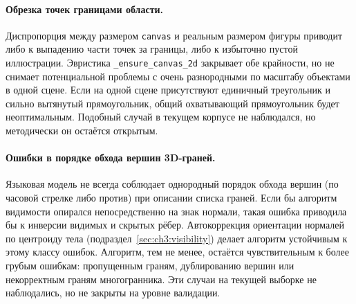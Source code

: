 \paragraph{Обрезка точек границами области.} Диспропорция между размером \texttt{canvas} и реальным размером фигуры приводит либо к выпадению части точек за границы, либо к избыточно пустой иллюстрации. Эвристика \texttt{\_ensure\_canvas\_2d} закрывает обе крайности, но не снимает потенциальной проблемы с очень разнородными по масштабу объектами в одной сцене. Если на одной сцене присутствуют единичный треугольник и сильно вытянутый прямоугольник, общий охватывающий прямоугольник будет неоптимальным. Подобный случай в текущем корпусе не наблюдался, но методически он остаётся открытым.

\paragraph{Ошибки в порядке обхода вершин 3D\nobreakdash-граней.} Языковая модель не всегда соблюдает однородный порядок обхода вершин (по часовой стрелке либо против) при описании списка граней. Если бы алгоритм видимости опирался непосредственно на знак нормали, такая ошибка приводила бы к инверсии видимых и скрытых рёбер. Автокоррекция ориентации нормалей по центроиду тела (подраздел~\ref{sec:ch3:visibility}) делает алгоритм устойчивым к этому классу ошибок. Алгоритм, тем не менее, остаётся чувствительным к более грубым ошибкам: пропущенным граням, дублированию вершин или некорректным граням многогранника. Эти случаи на текущей выборке не наблюдались, но не закрыты на уровне валидации.

